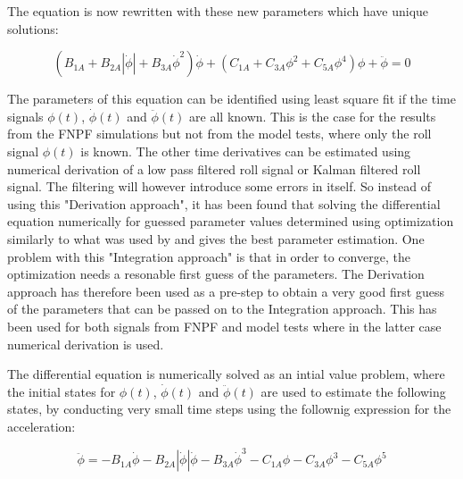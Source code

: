     

    The equation is now rewritten with these new parameters which have
unique solutions:
 
            
    
    \begin{equation}
\left(B_{1A} + B_{2A} \left|{\dot{\phi}}\right| + B_{3A} \dot{\phi}^{2}\right) \dot{\phi} + \left(C_{1A} + C_{3A} \phi^{2} + C_{5A} \phi^{4}\right) \phi + \ddot{\phi} = 0
\label{eq:equation}
\end{equation}

    

    The parameters of this equation can be identified using least square fit
if the time signals \(\phi(t)\), \(\dot{\phi}(t)\) and
\(\ddot{\phi}(t)\) are all known. This is the case for the results from
the FNPF simulations but not from the model tests, where only the roll
signal \(\phi(t)\) is known. The other time derivatives can be estimated
using numerical derivation of a low pass filtered roll signal or Kalman
filtered roll signal. The filtering will however introduce some errors
in itself. So instead of using this "Derivation approach", it has been
found that solving the differential equation numerically for guessed
parameter values determined using optimization similarly to what was
used by \cite{7505983/FJHQJJUH} and \cite{7505983/9B7QMVJJ} gives the
best parameter estimation. One problem with this "Integration approach"
is that in order to converge, the optimization needs a resonable first
guess of the parameters. The Derivation approach has therefore been used
as a pre-step to obtain a very good first guess of the parameters that
can be passed on to the Integration approach. This has been used for
both signals from FNPF and model tests where in the latter case
numerical derivation is used.

The differential equation is numerically solved as an intial value
problem, where the initial states for \(\phi(t)\), \(\dot{\phi}(t)\) and
\(\ddot{\phi}(t)\) are used to estimate the following states, by
conducting very small time steps using the follownig expression for the
acceleration:
 
            
    
    \begin{equation}
\ddot{\phi} = - B_{1A} \dot{\phi} - B_{2A} \left|{\dot{\phi}}\right| \dot{\phi} - B_{3A} \dot{\phi}^{3} - C_{1A} \phi - C_{3A} \phi^{3} - C_{5A} \phi^{5}
\label{eq:equation}
\end{equation}

